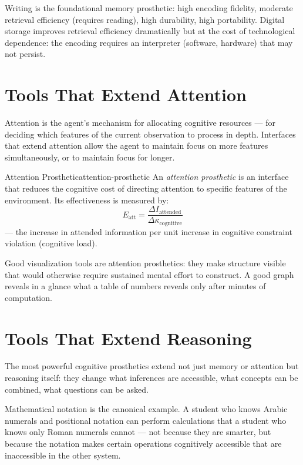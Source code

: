 Writing is the foundational memory prosthetic: high encoding fidelity,
moderate retrieval efficiency (requires reading), high durability,
high portability. Digital storage improves retrieval efficiency
dramatically but at the cost of technological dependence: the encoding
requires an interpreter (software, hardware) that may not persist.

\section{Tools That Extend Attention}

Attention is the agent's mechanism for allocating cognitive resources —
for deciding which features of the current observation to process in
depth. Interfaces that extend attention allow the agent to maintain
focus on more features simultaneously, or to maintain focus for longer.

\begin{definition}{Attention Prosthetic}{attention-prosthetic}
  An \emph{attention prosthetic} is an interface that reduces the
  cognitive cost of directing attention to specific features of the
  environment. Its effectiveness is measured by:
  \[
    E_\text{att} = \frac{\Delta I_\text{attended}}{
    \Delta \kappa_\text{cognitive}}
  \]
  — the increase in attended information per unit increase in cognitive
  constraint violation (cognitive load).
\end{definition}

Good visualization tools are attention prosthetics: they make structure
visible that would otherwise require sustained mental effort to construct.
A good graph reveals in a glance what a table of numbers reveals only
after minutes of computation.

\section{Tools That Extend Reasoning}

The most powerful cognitive prosthetics extend not just memory or
attention but reasoning itself: they change what inferences are
accessible, what concepts can be combined, what questions can be
asked.

Mathematical notation is the canonical example. A student who knows
Arabic numerals and positional notation can perform calculations that
a student who knows only Roman numerals cannot — not because they are
smarter, but because the notation makes certain operations cognitively
accessible that are inaccessible in the other system.

